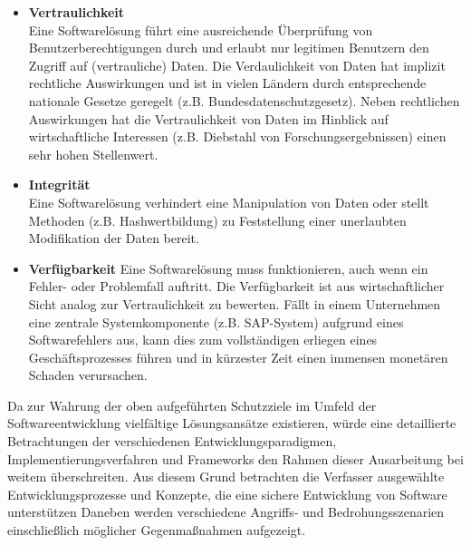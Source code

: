 \begin{itemize}
      \item\textbf{Vertraulichkeit}\\
 	   Eine Softwarelösung führt eine ausreichende Überprüfung von Benutzerberechtigungen durch und erlaubt nur legitimen Benutzern den Zugriff auf (vertrauliche) Daten. Die Verdaulichkeit von Daten hat implizit rechtliche Auswirkungen und ist in vielen Ländern durch entsprechende nationale Gesetze geregelt (z.B. Bundesdatenschutzgesetz). Neben rechtlichen Auswirkungen hat die Vertraulichkeit von Daten im Hinblick auf wirtschaftliche Interessen (z.B. Diebstahl von Forschungsergebnissen) einen sehr hohen Stellenwert.
	  
	  \item\textbf{Integrität}\\
	   Eine Softwarelösung verhindert eine Manipulation von Daten oder stellt Methoden (z.B. Hashwertbildung) zu Feststellung einer unerlaubten Modifikation der Daten bereit.
	  
	  \item\textbf{Verfügbarkeit} 
	   Eine Softwarelösung muss funktionieren, auch wenn ein Fehler- oder Problemfall auftritt. Die Verfügbarkeit ist aus wirtschaftlicher Sicht analog zur Vertraulichkeit zu bewerten. Fällt in einem Unternehmen eine zentrale Systemkomponente (z.B. SAP-System) aufgrund eines Softwarefehlers aus, kann dies zum vollständigen erliegen eines Geschäftsprozesses führen und in kürzester Zeit einen immensen monetären Schaden verursachen.
\end{itemize}

Da zur Wahrung der oben aufgeführten Schutzziele im Umfeld der Softwareentwicklung vielfältige Lösungsansätze existieren, würde eine detaillierte Betrachtungen der verschiedenen Entwicklungsparadigmen, Implementierungsverfahren und Frameworks den Rahmen dieser Ausarbeitung bei weitem überschreiten. Aus diesem Grund betrachten die Verfasser ausgewählte Entwicklungsprozesse und Konzepte, die eine sichere Entwicklung von Software unterstützen Daneben werden verschiedene Angriffs- und Bedrohungsszenarien einschließlich möglicher Gegenmaßnahmen aufgezeigt.


